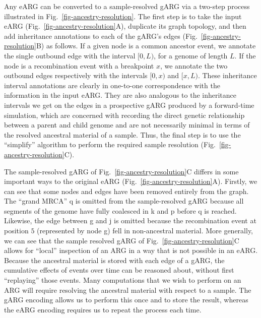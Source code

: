 \documentclass{article}
\newcommand{\noderef}[1]{\textsf{#1}}
\begin{document}
Any eARG can be converted to a sample-resolved gARG
via a two-step process illustrated in Fig.~\ref{fig-ancestry-resolution}.
The first step is to take the input eARG (Fig.~\ref{fig-ancestry-resolution}A),
duplicate its graph topology, and then add inheritance annotations
to each of the gARG's edges (Fig.~\ref{fig-ancestry-resolution}B) as follows.
If a given node is a common ancestor event, we annotate the single
outbound edge with the interval $[0,L)$, for a genome of length $L$. If the
node is a recombination event with a breakpoint $x$, we annotate the two
outbound edges respectively with the intervals $[0, x)$ and $[x, L)$. These
inheritance interval annotations are clearly in one-to-one correspondence with
the information in the input eARG. They are also analogous to the
inheritance intervals we get on the edges in a prospective gARG
produced by a forward-time simulation, which are concerned with recording
the direct genetic relationship between a parent and child genome and are not
necessarily minimal in terms of the resolved ancestral material of a sample.
Thus, the final step is to use the ``simplify'' algorithm to perform the required
sample resolution (Fig.~\ref{fig-ancestry-resolution}C).

The sample-resolved gARG of Fig.~\ref{fig-ancestry-resolution}C
differs in some important ways to the
original eARG (Fig.~\ref{fig-ancestry-resolution}A).
Firstly, we can see that some nodes and edges have been removed entirely
from the graph.
The ``grand MRCA'' \noderef{q} is omitted from the
sample-resolved gARG because all segments of the genome have
fully coalesced in \noderef{k} and \noderef{p} before \noderef{q} is reached.
Likewise, the edge
between \noderef{g} and \noderef{j} is omitted because the recombination
event at position $5$ (represented by node \noderef{g})
fell in non-ancestral material.
More generally, we can see that the sample resolved
gARG of Fig.~\ref{fig-ancestry-resolution}C
allows for ``local'' inspection
of an ARG in a way that is not possible in an eARG.
Because the ancestral material is stored with each edge of a gARG, the
cumulative effects of events over time can be reasoned
about, without first ``replaying'' those events.
Many computations
that we wish to perform on an ARG will require resolving
the ancestral material with respect to a sample.
The gARG encoding
allows us to perform this once
and to store the result,
whereas the eARG encoding requires us to repeat the process
each time.
\end{document}
